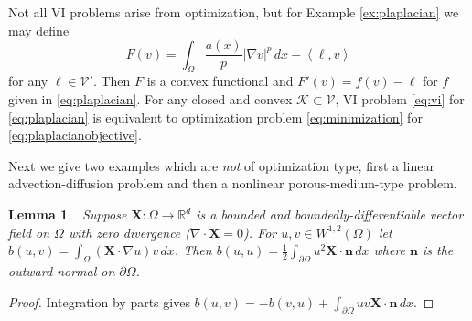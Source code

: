 \documentclass[letterpaper,final,12pt,reqno]{amsart}
\theoremstyle{cstyle}
\newtheorem{lemma}[theorem]{Lemma}
\theoremstyle{cstyle*}
\theoremstyle{dstyle}
\numberwithin{equation}{section}
\numberwithin{figure}{section}
\numberwithin{table}{section}
\numberwithin{theorem}{section}
\newcommand{\RR}{\mathbb{R}}
\newcommand{\grad}{\nabla}
\newcommand{\Div}{\nabla\cdot}
\newcommand{\bn}{\mathbf{n}}
\newcommand{\bX}{\mathbf{X}}
\newcommand{\cK}{\mathcal{K}}
\newcommand{\cV}{\mathcal{V}}
\newcommand{\ip}[2]{\left<#1,#2\right>}
\begin{document}
Not all VI problems arise from optimization, but for Example \ref{ex:plaplacian} we may define
\begin{equation}
F(v) = \int_\Omega \frac{a(x)}{p} |\grad v|^p\,dx - \ip{\ell}{v} \label{eq:plaplacianobjective}
\end{equation}
for any $\ell\in\cV'$.  Then $F$ is a convex functional and $F'(v) = f(v) - \ell$ for $f$ given in \eqref{eq:plaplacian}.  For any closed and convex $\cK\subset \cV$, VI problem \eqref{eq:vi} for \eqref{eq:plaplacian} is equivalent to optimization problem \eqref{eq:minimization} for \eqref{eq:plaplacianobjective}.

Next we give two examples which are \emph{not} of optimization type, first a linear advection-diffusion problem and then a nonlinear porous-medium-type problem.

\begin{lemma}  \label{lem:advectionskew}  \cite{Elmanetal2014}\,  Suppose $\bX :\Omega \to \RR^d$ is a bounded and boundedly-differentiable vector field on $\Omega$ with zero divergence ($\Div \bX=0$).  For $u,v \in W^{1,2}(\Omega)$ let $b(u,v) = \int_\Omega (\bX \cdot \grad u) v\,dx$.  Then $b(u,u) = \frac{1}{2} \int_{\partial \Omega} u^2 \bX\cdot \bn\,dx$ where $\bn$ is the outward normal on $\partial \Omega$.
\end{lemma}

\begin{proof}
Integration by parts gives $b(u,v) = - b(v,u) + \int_{\partial \Omega} uv \bX\cdot \bn\,dx$.
\end{proof}
\end{document}
